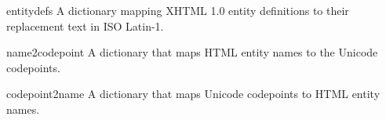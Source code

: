 \begin{datadesc}{entitydefs}
  A dictionary mapping XHTML 1.0 entity definitions to their
  replacement text in ISO Latin-1.

\end{datadesc}

\begin{datadesc}{name2codepoint}
  A dictionary that maps HTML entity names to the Unicode codepoints.
\end{datadesc}

\begin{datadesc}{codepoint2name}
  A dictionary that maps Unicode codepoints to HTML entity names.
\end{datadesc}
